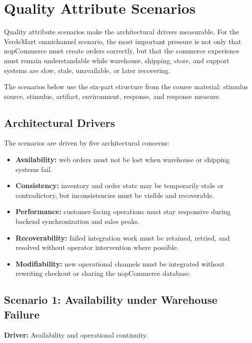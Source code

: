 \chapter{Quality Attribute Scenarios}

Quality attribute scenarios make the architectural drivers measurable. For the VerdeMart
omnichannel scenario, the most important pressure is not only that nopCommerce must create
orders correctly, but that the commerce experience must remain understandable while warehouse,
shipping, store, and support systems are slow, stale, unavailable, or later recovering.

The scenarios below use the six-part structure from the course material: stimulus source,
stimulus, artifact, environment, response, and response measure.

\section{Architectural Drivers}

The scenarios are driven by five architectural concerns:

\begin{itemize}
    \item \textbf{Availability:} web orders must not be lost when warehouse or shipping systems fail.
    \item \textbf{Consistency:} inventory and order state may be temporarily stale or contradictory, but inconsistencies must be visible and recoverable.
    \item \textbf{Performance:} customer-facing operations must stay responsive during backend synchronization and sales peaks.
    \item \textbf{Recoverability:} failed integration work must be retained, retried, and resolved without operator intervention where possible.
    \item \textbf{Modifiability:} new operational channels must be integrated without rewriting checkout or sharing the nopCommerce database.
\end{itemize}

\section{Scenario 1: Availability under Warehouse Failure}

\textbf{Driver:} Availability and operational continuity.

